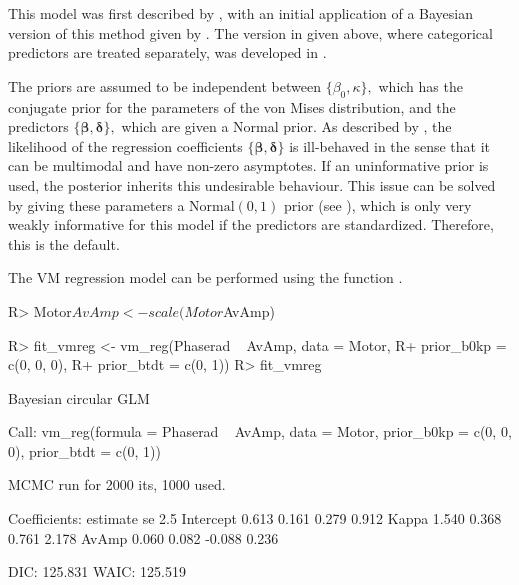 This model was first described by \citet{fisher1992regression}, with an
initial application of a Bayesian version of this method given by
\citet{gill2010}. The version in  given above, where
categorical predictors are treated separately, was developed in
\citet{mulder2017bayesian}.

The priors are assumed to be independent between
\(\{\beta_0, \kappa\},\) which has the conjugate prior for the
parameters of the von Mises distribution, and the predictors
\(\{\boldsymbol{\beta}, \boldsymbol{\delta}\},\) which are given a
Normal prior. As described by \citet{gill2010}, the likelihood of the
regression coefficients \(\{\boldsymbol{\beta}, \boldsymbol{\delta}\}\)
is ill-behaved in the sense that it can be multimodal and have non-zero
asymptotes. If an uninformative prior is used, the posterior inherits
this undesirable behaviour. This issue can be solved by giving these
parameters a \(\text{Normal}(0, 1)\) prior (see
\citet{mulder2017bayesian}), which is only very weakly informative for
this model if the predictors are standardized. Therefore, this is the
default.

The VM regression model can be performed using the function
.

\begin{CodeChunk}

\begin{CodeInput}
R> Motor$AvAmp <- scale(Motor$AvAmp)
\end{CodeInput}
\end{CodeChunk}

\begin{CodeChunk}

\begin{CodeInput}
R> fit_vmreg <- vm_reg(Phaserad ~ AvAmp, data = Motor, 
R+                     prior_b0kp = c(0, 0, 0),
R+                     prior_btdt = c(0, 1))
R> fit_vmreg
\end{CodeInput}

\begin{CodeOutput}
Bayesian circular GLM 

Call:
vm_reg(formula = Phaserad ~ AvAmp, data = Motor, prior_b0kp = c(0, 
    0, 0), prior_btdt = c(0, 1))

MCMC run for 2000 its, 1000 used. 

Coefficients:
          estimate    se   2.5%
Intercept    0.613 0.161  0.279 0.912
Kappa        1.540 0.368  0.761 2.178
AvAmp        0.060 0.082 -0.088 0.236

DIC:  125.831 
WAIC: 125.519 
\end{CodeOutput}
\end{CodeChunk}

